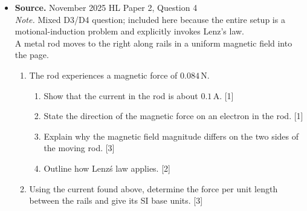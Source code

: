 \documentclass[11pt]{article}
\begin{document}
\begin{itemize}[leftmargin=1.25em]
\begin{enumerate}[label=(\alph*), leftmargin=1.5em]
\setcounter{enumi}{2}
\item
\begin{enumerate}[label=(\roman*), leftmargin=1.5em]
\item Explain why no current is induced in the coil while the current in $R$ remains constant. [2]
\item The current in $R$ increases uniformly from $2.0\,\text{A}$ to $10.0\,\text{A}$ in $0.5\,\text{s}$. Calculate the induced emf in the coil. [3]
\item Deduce the direction of the induced current. [2]
\end{enumerate}
\item The coil is then rotated so that an emf is induced. An emf-time graph is given. The rotation frequency is doubled. Draw the new emf-time graph. [2]
\end{enumerate}
\item
\textbf{Source.} November 2025 HL Paper 2, Question 4\\
\textit{Note.} Mixed D3/D4 question; included here because the entire setup is a motional-induction problem and explicitly invokes Lenz's law.\\
A metal rod moves to the right along rails in a uniform magnetic field into the page.

\begin{enumerate}[label=(\alph*), leftmargin=1.5em]
\item The rod experiences a magnetic force of $0.084\,\text{N}$.
\begin{enumerate}[label=(\roman*), leftmargin=1.5em]
\item Show that the current in the rod is about $0.1\,\text{A}$. [1]
\item State the direction of the magnetic force on an electron in the rod. [1]
\item Explain why the magnetic field magnitude differs on the two sides of the moving rod. [3]
\item Outline how Lenz\'s law applies. [2]
\end{enumerate}
\item Using the current found above, determine the force per unit length between the rails and give its SI base units. [3]
\end{enumerate}
\end{itemize}
\end{document}
